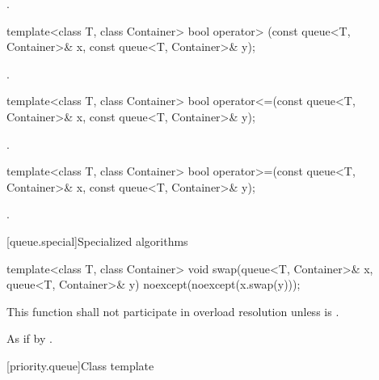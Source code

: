 \begin{codeblock}
\begin{itemdescr}
\pnum
\returns
{}.
\end{itemdescr}

%
\begin{itemdecl}
template<class T, class Container>
  bool operator> (const queue<T, Container>& x, const queue<T, Container>& y);
\end{itemdecl}

\begin{itemdescr}
\pnum
\returns
{}.
\end{itemdescr}

%
\begin{itemdecl}
template<class T, class Container>
  bool operator<=(const queue<T, Container>& x, const queue<T, Container>& y);
\end{itemdecl}

\begin{itemdescr}
\pnum
\returns
{}.
\end{itemdescr}

%
\begin{itemdecl}
template<class T, class Container>
    bool operator>=(const queue<T, Container>& x,
                    const queue<T, Container>& y);
\end{itemdecl}

\begin{itemdescr}
\pnum
\returns
{}.
\end{itemdescr}

[queue.special]{Specialized algorithms}

%
\begin{itemdecl}
template<class T, class Container>
  void swap(queue<T, Container>& x, queue<T, Container>& y) noexcept(noexcept(x.swap(y)));
\end{itemdecl}

\begin{itemdescr}
\pnum
\remarks
This function shall not participate in overload resolution
unless  is .

\pnum
\effects As if by .
\end{itemdescr}

[priority.queue]{Class template }


\end{codeblock}
